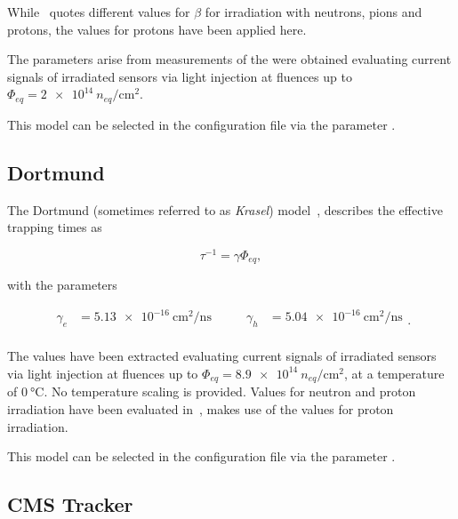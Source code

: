 While~\cite{kramberger} quotes different values for $\beta$ for irradiation with neutrons, pions and protons, the values for protons have been applied here.

The parameters arise from measurements of the were obtained evaluating current signals of irradiated sensors via light injection at fluences up to $\Phi_{eq} = \SI{2e14}{n_{eq} \per \cm^2}$.

This model can be selected in the configuration file via the parameter .

\subsection{Dortmund}

The Dortmund (sometimes referred to as \textit{Krasel}) model~\cite{dortmundTrapping}, describes the effective trapping times as

\begin{equation*}
    \tau^{-1} = \gamma\Phi_{eq} ,
\end{equation*}

with the parameters

\begin{equation*}
    \begin{split}
        \gamma_{e} &= \SI{5.13e-16}{\cm^2 \per \ns} \\
    \end{split}
    \qquad
    \begin{split}
        \gamma_{h} &= \SI{5.04e-16}{\cm^2 \per \ns} \\
    \end{split}.
\end{equation*}

The values have been extracted evaluating current signals of irradiated sensors via light injection at fluences up to $\Phi_{eq} = \SI{8.9e14}{n_{eq} \per \cm^2}$, at a temperature of $\SI{0}{\celsius}$.
No temperature scaling is provided.
Values for neutron and proton irradiation have been evaluated in~\cite{dortmundTrapping}, \apsq makes use of the values for proton irradiation.

This model can be selected in the configuration file via the parameter .

\subsection{CMS Tracker}

